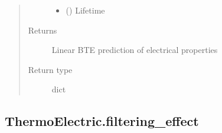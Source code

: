 \documentclass[letterpaper,10pt,english]{sphinxmanual}
\begin{document}
\begin{fulllineitems}
\begin{quote}
\begin{description}
\begin{itemize}
\item {} 
\sphinxAtStartPar
{} () \textendash{} Lifetime

\end{itemize}

\item[{Returns}] \leavevmode
\sphinxAtStartPar
{} \textendash{} Linear BTE prediction of electrical properties

\item[{Return type}] \leavevmode
\sphinxAtStartPar
dict

\end{description}\end{quote}

\end{fulllineitems}



\subsection{ThermoElectric.filtering\_effect}
\label{\detokenize{autosummary/ThermoElectric.filtering_effect:thermoelectric-filtering-effect}}\label{\detokenize{autosummary/ThermoElectric.filtering_effect::doc}}
\end{document}
